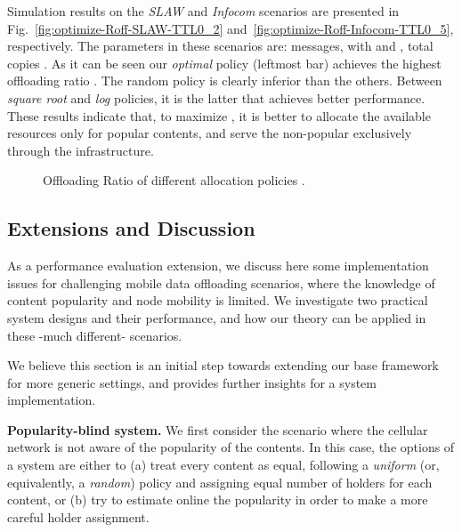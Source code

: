 \documentclass[journal]{IEEEtran}
\newcommand{\revisionRed}[1]{{#1}}\newcommand{\red}[1]{{#1}}
\begin{document}
Simulation results on the \textit{SLAW} and \textit{Infocom} scenarios are presented in Fig.~\ref{fig:optimize-Roff-SLAW-TTL0_2} and~\ref{fig:optimize-Roff-Infocom-TTL0_5}, respectively. The parameters in these scenarios are:  messages,  with  and , total copies . As it can be seen our \textit{optimal} policy (leftmost bar) achieves the highest offloading ratio . The random policy is clearly inferior than the others. Between \textit{square root} and \textit{log} policies, it is the latter that achieves better performance. These results indicate that, to maximize , it is better to allocate the available resources only for popular contents, and serve the non-popular exclusively through the infrastructure.

\begin{figure}
\centering
{}
\caption{Offloading Ratio  of different allocation policies .}
\label{fig:optimize-Roff}
\end{figure}	



\subsection{\revisionRed{Extensions and Discussion}}

\revisionRed{
As a performance evaluation extension, we discuss here some implementation issues for challenging mobile data offloading scenarios, where the knowledge of content popularity and node mobility is limited. We investigate two practical system designs and their performance, and how our theory can be applied in these -much different- scenarios. 
}

\revisionRed{
We believe this section is an initial step towards extending our base framework for more generic settings, and provides further insights for a system implementation.
}


\revisionRed{
\textbf{Popularity-blind system.} We first consider the scenario where the cellular network is not aware of the popularity of the contents. In this case, the options of a system are either to (a) treat every content as equal, following a \textit{uniform} (or, equivalently, a \textit{random}) policy and assigning equal number of holders for each content, or (b) try to estimate online the popularity in order to make a more careful holder assignment.
}
\end{document}
